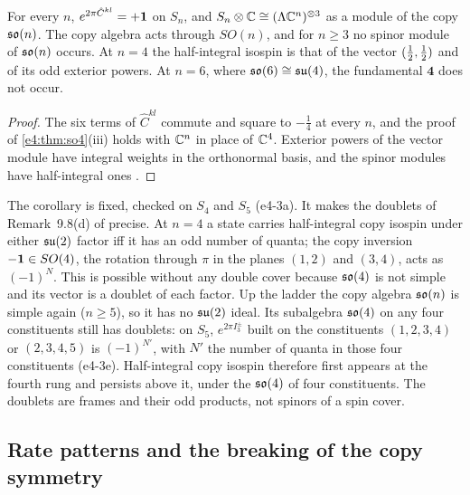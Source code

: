 \begin{corollary}
\label{e4:cor:nospinor}
For every $n$, $e^{2\pi\hat C^{kl}}=+\mathbf 1$ on $S_n$, and $S_n\otimes\mathbb{C}\cong(\Lambda\mathbb{C}^n)^{\otimes3}$ as a module of the copy $\mathfrak{so}(n)$. The copy algebra acts through
$SO(n)$, and for $n\ge3$ no spinor module of $\mathfrak{so}(n)$ occurs. At $n=4$ the half-integral isospin is that of the vector $(\tfrac12,\tfrac12)$ and of its odd
exterior powers. At $n=6$, where $\mathfrak{so}(6)\cong\mathfrak{su}(4)$, the fundamental $\mathbf 4$ does not occur.
\end{corollary}

\begin{proof}
The six terms of $\hat C^{kl}$ commute and square to $-\tfrac14$ at every $n$, and the proof of \cref{e4:thm:so4}(iii) holds with $\mathbb{C}^n$ in place of $\mathbb{C}^4$.
Exterior powers of the vector module have integral weights in the orthonormal basis, and the spinor modules have half-integral ones
\cite{LawsonMichelsohn89}.
\end{proof}

The corollary is fixed, checked on $S_4$ and $S_5$ (e4-3a). It makes the doublets of Remark~9.8(d) of \cite{RE} precise. At $n=4$ a state carries
half-integral copy isospin under either $\mathfrak{su}(2)$ factor iff it has an odd number of quanta; the copy inversion $-\mathbf 1\in SO(4)$, the rotation through $\pi$
in the planes $(1,2)$ and $(3,4)$, acts as $(-1)^N$. This is possible without any double cover because $\mathfrak{so}(4)$ is not simple and its vector is a
doublet of each factor. Up the ladder the copy algebra $\mathfrak{so}(n)$ is simple again ($n\ge5$), so it has no $\mathfrak{su}(2)$ ideal. Its subalgebra $\mathfrak{so}(4)$ on any four
constituents still has doublets: on $S_5$, $e^{2\pi I^\pm_3}$ built on the constituents $(1,2,3,4)$ or $(2,3,4,5)$ is $(-1)^{N'}$, with $N'$ the number of
quanta in those four constituents (e4-3e). Half-integral copy isospin therefore first appears at the fourth rung and persists above it, under
the $\mathfrak{so}(4)$ of four constituents. The doublets are frames and their odd products, not spinors of a spin cover.

\subsection{Rate patterns and the breaking of the copy symmetry}
\label{e4:sec:rates}

